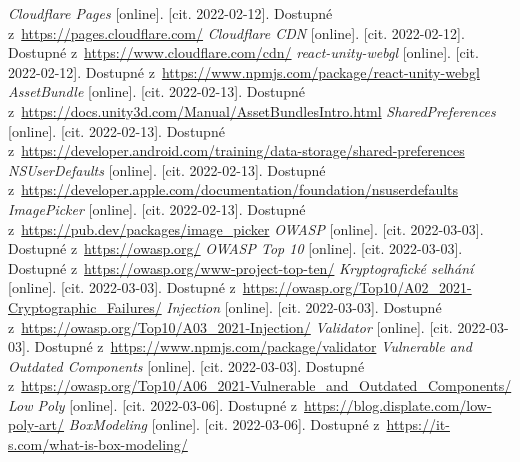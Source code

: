 \begin{thebibliography}{99}
     \textit{Cloudflare Pages} [online]. [cit. 2022-02-12]. Dostupné z~\url{https://pages.cloudflare.com/}
     \textit{Cloudflare CDN} [online]. [cit. 2022-02-12]. Dostupné z~\url{https://www.cloudflare.com/cdn/}
     \textit{react-unity-webgl} [online]. [cit. 2022-02-12]. Dostupné z~\url{https://www.npmjs.com/package/react-unity-webgl}
     \textit{AssetBundle} [online]. [cit. 2022-02-13]. Dostupné z~\url{https://docs.unity3d.com/Manual/AssetBundlesIntro.html}
     \textit{SharedPreferences} [online]. [cit. 2022-02-13]. Dostupné z~\url{https://developer.android.com/training/data-storage/shared-preferences}
     \textit{NSUserDefaults} [online]. [cit. 2022-02-13]. Dostupné z~\url{https://developer.apple.com/documentation/foundation/nsuserdefaults}
     \textit{ImagePicker} [online]. [cit. 2022-02-13]. Dostupné z~\url{https://pub.dev/packages/image_picker}
     \textit{OWASP} [online]. [cit. 2022-03-03]. Dostupné z~\url{https://owasp.org/}
     \textit{OWASP Top 10} [online]. [cit. 2022-03-03]. Dostupné z~\url{https://owasp.org/www-project-top-ten/}
     \textit{Kryptografické selhání} [online]. [cit. 2022-03-03]. Dostupné z~\url{https://owasp.org/Top10/A02_2021-Cryptographic_Failures/}
     \textit{Injection} [online]. [cit. 2022-03-03]. Dostupné z~\url{https://owasp.org/Top10/A03_2021-Injection/}
     \textit{Validator} [online]. [cit. 2022-03-03]. Dostupné z~\url{https://www.npmjs.com/package/validator}
     \textit{Vulnerable and Outdated Components} [online]. [cit. 2022-03-03]. Dostupné z~\url{https://owasp.org/Top10/A06_2021-Vulnerable_and_Outdated_Components/}
     \textit{Low Poly} [online]. [cit. 2022-03-06]. Dostupné z~\url{https://blog.displate.com/low-poly-art/}
     \textit{BoxModeling} [online]. [cit. 2022-03-06]. Dostupné z~\url{https://it-s.com/what-is-box-modeling/}
\end{thebibliography}